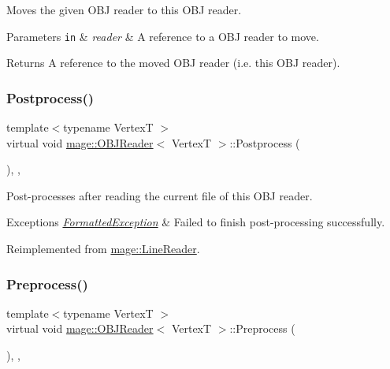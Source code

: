 Moves the given O\+BJ reader to this O\+BJ reader.


\begin{DoxyParams}[1]{Parameters}
\mbox{\tt in}  & {\em reader} & A reference to a O\+BJ reader to move. \\
\hline
\end{DoxyParams}
\begin{DoxyReturn}{Returns}
A reference to the moved O\+BJ reader (i.\+e. this O\+BJ reader). 
\end{DoxyReturn}
\hypertarget{classmage_1_1_o_b_j_reader_a248977c8300575ed2bab04df26197919}{}\label{classmage_1_1_o_b_j_reader_a248977c8300575ed2bab04df26197919} 
\subsubsection{\texorpdfstring{Postprocess()}{Postprocess()}}
{\footnotesize\ttfamily template$<$typename VertexT $>$ \\
virtual void \hyperlink{classmage_1_1_o_b_j_reader}{mage\+::\+O\+B\+J\+Reader}$<$ VertexT $>$\+::Postprocess (\begin{DoxyParamCaption}{ }\end{DoxyParamCaption})\hspace{0.3cm}{\ttfamily [override]}, {\ttfamily [private]}, {\ttfamily [virtual]}}

Post-\/processes after reading the current file of this O\+BJ reader.


\begin{DoxyExceptions}{Exceptions}
{\em \hyperlink{classmage_1_1_formatted_exception}{Formatted\+Exception}} & Failed to finish post-\/processing successfully. \\
\hline
\end{DoxyExceptions}


Reimplemented from \hyperlink{classmage_1_1_line_reader_adfde21013140a1058d3dd567204abfb5}{mage\+::\+Line\+Reader}.

\hypertarget{classmage_1_1_o_b_j_reader_ae3a3ad3b50f1dd8dffe3109fc7dc2937}{}\label{classmage_1_1_o_b_j_reader_ae3a3ad3b50f1dd8dffe3109fc7dc2937} 
\subsubsection{\texorpdfstring{Preprocess()}{Preprocess()}}
{\footnotesize\ttfamily template$<$typename VertexT $>$ \\
virtual void \hyperlink{classmage_1_1_o_b_j_reader}{mage\+::\+O\+B\+J\+Reader}$<$ VertexT $>$\+::Preprocess (\begin{DoxyParamCaption}{ }\end{DoxyParamCaption})\hspace{0.3cm}{\ttfamily [override]}, {\ttfamily [private]}, {\ttfamily [virtual]}}

